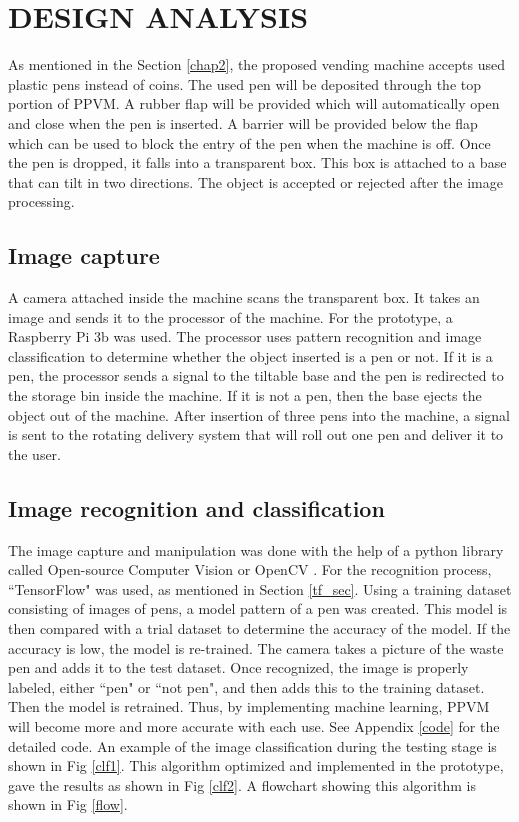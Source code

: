 \chapter{DESIGN ANALYSIS}\label{design analysis}
\thispagestyle{empty}

As mentioned in the Section \ref{chap2}, the proposed vending machine accepts used plastic pens instead of coins. The used pen will be deposited through the top portion of PPVM. A rubber flap will be provided which will automatically open and close when the pen is inserted. A barrier will be provided below the flap which can be used to block the entry of the pen when the machine is off. Once the pen is dropped, it falls into a transparent box. This box is attached to a base that can tilt in two directions. The object is accepted or rejected after the image processing.

\section{Image capture}
A camera attached inside the machine scans the transparent box. It takes an image and sends it to the processor of the machine. For the prototype, a Raspberry Pi 3b was used. The processor uses pattern recognition and image classification to determine whether the object inserted is a pen or not. If it is a pen, the processor sends a signal to the tiltable base and the pen is redirected to the storage bin inside the machine. If it is not a pen, then the base ejects the object out of the machine. After insertion of three pens into the machine, a signal is sent to the rotating delivery system that will roll out one pen and deliver it to the user.

\section{Image recognition and classification}
The image capture and manipulation was done with the help of a python library called Open-source Computer Vision or OpenCV \cite{opencv}. For the recognition process, ``TensorFlow" was used, as mentioned in Section \ref{tf_sec}. Using a training dataset consisting of images of pens, a model pattern of a pen was created. This model is then compared with a trial dataset to determine the accuracy of the model. If the accuracy is low, the model is re-trained. The camera takes a picture of the waste pen and adds it to the test dataset. Once recognized, the image is properly labeled, either ``pen" or ``not pen", and then adds this to the training dataset. Then the model is retrained. Thus, by implementing machine learning, PPVM will become more and more accurate with each use. See Appendix \ref{code} for the detailed code. An example of the image classification during the testing stage is shown in Fig \ref{clf1}. This algorithm optimized and implemented in the prototype, gave the results as shown in Fig \ref{clf2}. A flowchart showing this algorithm is shown in Fig \ref{flow}.

